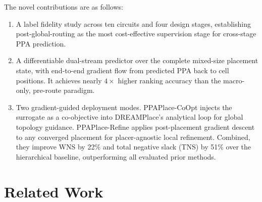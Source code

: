 \documentclass[sigconf,anonymous,review,9pt]{acmart}
\begin{document}
The novel contributions are as follows:

\begin{enumerate}
    \item A label fidelity study across ten circuits and four design
    stages, establishing post-global-routing as the most
    cost-effective supervision stage for cross-stage PPA prediction.

    \item A differentiable dual-stream predictor over the complete
    mixed-size placement state, with end-to-end gradient flow from
    predicted PPA back to cell positions. It achieves nearly
    $4\times$ higher ranking accuracy than the macro-only, pre-route
    paradigm.

    \item Two gradient-guided deployment modes. PPAPlace-CoOpt
    injects the surrogate as a co-objective into DREAMPlace's
    analytical loop for global topology guidance. PPAPlace-Refine
    applies post-placement gradient descent to any converged
    placement for placer-agnostic local refinement. Combined, they
    improve WNS by 22\% and total negative slack (TNS) by 51\% over the hierarchical
    baseline, outperforming all evaluated prior methods.
\end{enumerate}

\section{Related Work}
\label{sec:related}
\end{document}
